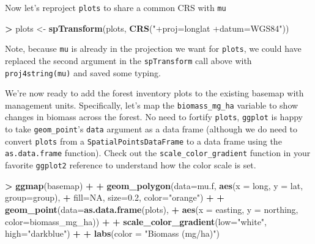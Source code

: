 \documentclass[
]{krantz}
\makeatletter
\newenvironment{Shaded}{\begin{snugshade}}{\end{snugshade}}
\newcommand{\DataTypeTok}[1]{\textcolor[rgb]{0.27,0.27,0.27}{#1}}
\newcommand{\FloatTok}[1]{\textcolor[rgb]{0.06,0.06,0.06}{#1}}
\newcommand{\KeywordTok}[1]{\textcolor[rgb]{0.27,0.27,0.27}{\textbf{#1}}}
\newcommand{\NormalTok}[1]{#1}
\newcommand{\OperatorTok}[1]{\textcolor[rgb]{0.43,0.43,0.43}{\textbf{#1}}}
\newcommand{\OtherTok}[1]{\textcolor[rgb]{0.37,0.37,0.37}{#1}}
\newcommand{\StringTok}[1]{\textcolor[rgb]{0.5,0.5,0.5}{#1}}
\newenvironment{kframe}{%
\medskip{}
\setlength{\fboxsep}{.8em}
 \def\at@end@of@kframe{}%
 \ifinner\ifhmode%
  \def\at@end@of@kframe{\end{minipage}}%
  \begin{minipage}{\columnwidth}%
 \fi\fi%
 \def\FrameCommand##1{\hskip\@totalleftmargin \hskip-\fboxsep
 \colorbox{shadecolor}{##1}\hskip-\fboxsep
     \hskip-\linewidth \hskip-\@totalleftmargin \hskip\columnwidth}%
 \MakeFramed {\advance\hsize-\width
   \@totalleftmargin\z@ \linewidth\hsize
   \@setminipage}}%
 {\par\unskip\endMakeFramed%
 \at@end@of@kframe}
\renewenvironment{Shaded}{\begin{kframe}}{\end{kframe}}
\makeatother
\begin{document}
Now let's reproject \texttt{plots} to share a common CRS with \texttt{mu}

\begin{Shaded}
\begin{Highlighting}[]
\OperatorTok{\textgreater{}}\StringTok{ }\NormalTok{plots \textless{}{-}}\StringTok{ }\KeywordTok{spTransform}\NormalTok{(plots, }\KeywordTok{CRS}\NormalTok{(}\StringTok{"+proj=longlat +datum=WGS84"}\NormalTok{))}
\end{Highlighting}
\end{Shaded}

Note, because \texttt{mu} is already in the projection we want for \texttt{plots}, we could have replaced the second argument in the \texttt{spTransform} call above with \texttt{proj4string(mu)} and saved some typing.

We're now ready to add the forest inventory plots to the existing basemap with management units. Specifically, let's map the \texttt{biomass\_mg\_ha} variable to show changes in biomass across the forest. No need to fortify \texttt{plots}, \texttt{ggplot} is happy to take \texttt{geom\_point}'s \texttt{data} argument as a data frame (although we do need to convert \texttt{plots} from a \texttt{SpatialPointsDataFrame} to a data frame using the \texttt{as.data.frame} function). Check out the \texttt{scale\_color\_gradient} function in your favorite \texttt{ggplot2} reference to understand how the color scale is set.

\begin{Shaded}
\begin{Highlighting}[]
\OperatorTok{\textgreater{}}\StringTok{ }\KeywordTok{ggmap}\NormalTok{(basemap) }\OperatorTok{+}
\OperatorTok{+}\StringTok{     }\KeywordTok{geom\_polygon}\NormalTok{(}\DataTypeTok{data=}\NormalTok{mu.f, }\KeywordTok{aes}\NormalTok{(}\DataTypeTok{x =}\NormalTok{ long, }\DataTypeTok{y =}\NormalTok{ lat, }\DataTypeTok{group=}\NormalTok{group), }
\OperatorTok{+}\StringTok{                  }\DataTypeTok{fill=}\OtherTok{NA}\NormalTok{, }\DataTypeTok{size=}\FloatTok{0.2}\NormalTok{, }\DataTypeTok{color=}\StringTok{"orange"}\NormalTok{) }\OperatorTok{+}
\OperatorTok{+}\StringTok{     }\KeywordTok{geom\_point}\NormalTok{(}\DataTypeTok{data=}\KeywordTok{as.data.frame}\NormalTok{(plots), }
\OperatorTok{+}\StringTok{                }\KeywordTok{aes}\NormalTok{(}\DataTypeTok{x =}\NormalTok{ easting, }\DataTypeTok{y =}\NormalTok{ northing, }\DataTypeTok{color=}\NormalTok{biomass\_mg\_ha)) }\OperatorTok{+}\StringTok{ }
\OperatorTok{+}\StringTok{     }\KeywordTok{scale\_color\_gradient}\NormalTok{(}\DataTypeTok{low=}\StringTok{"white"}\NormalTok{, }\DataTypeTok{high=}\StringTok{"darkblue"}\NormalTok{) }\OperatorTok{+}
\OperatorTok{+}\StringTok{     }\KeywordTok{labs}\NormalTok{(}\DataTypeTok{color =} \StringTok{"Biomass (mg/ha)"}\NormalTok{)}
\end{Highlighting}
\end{Shaded}
\end{document}
